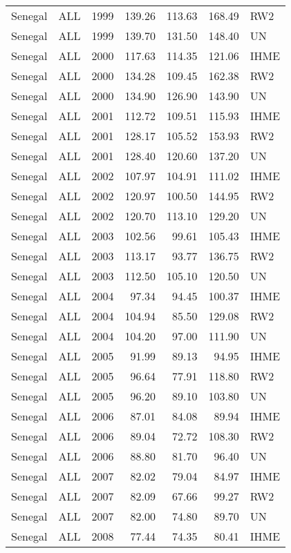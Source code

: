 \begin{longtable}{lllrrrl}
  Senegal & ALL & 1999 & 139.26 & 113.63 & 168.49 & RW2 \\ 
  Senegal & ALL & 1999 & 139.70 & 131.50 & 148.40 & UN \\ 
  Senegal & ALL & 2000 & 117.63 & 114.35 & 121.06 & IHME \\ 
  Senegal & ALL & 2000 & 134.28 & 109.45 & 162.38 & RW2 \\ 
  Senegal & ALL & 2000 & 134.90 & 126.90 & 143.90 & UN \\ 
  Senegal & ALL & 2001 & 112.72 & 109.51 & 115.93 & IHME \\ 
  Senegal & ALL & 2001 & 128.17 & 105.52 & 153.93 & RW2 \\ 
  Senegal & ALL & 2001 & 128.40 & 120.60 & 137.20 & UN \\ 
  Senegal & ALL & 2002 & 107.97 & 104.91 & 111.02 & IHME \\ 
  Senegal & ALL & 2002 & 120.97 & 100.50 & 144.95 & RW2 \\ 
  Senegal & ALL & 2002 & 120.70 & 113.10 & 129.20 & UN \\ 
  Senegal & ALL & 2003 & 102.56 & 99.61 & 105.43 & IHME \\ 
  Senegal & ALL & 2003 & 113.17 & 93.77 & 136.75 & RW2 \\ 
  Senegal & ALL & 2003 & 112.50 & 105.10 & 120.50 & UN \\ 
  Senegal & ALL & 2004 & 97.34 & 94.45 & 100.37 & IHME \\ 
  Senegal & ALL & 2004 & 104.94 & 85.50 & 129.08 & RW2 \\ 
  Senegal & ALL & 2004 & 104.20 & 97.00 & 111.90 & UN \\ 
  Senegal & ALL & 2005 & 91.99 & 89.13 & 94.95 & IHME \\ 
  Senegal & ALL & 2005 & 96.64 & 77.91 & 118.80 & RW2 \\ 
  Senegal & ALL & 2005 & 96.20 & 89.10 & 103.80 & UN \\ 
  Senegal & ALL & 2006 & 87.01 & 84.08 & 89.94 & IHME \\ 
  Senegal & ALL & 2006 & 89.04 & 72.72 & 108.30 & RW2 \\ 
  Senegal & ALL & 2006 & 88.80 & 81.70 & 96.40 & UN \\ 
  Senegal & ALL & 2007 & 82.02 & 79.04 & 84.97 & IHME \\ 
  Senegal & ALL & 2007 & 82.09 & 67.66 & 99.27 & RW2 \\ 
  Senegal & ALL & 2007 & 82.00 & 74.80 & 89.70 & UN \\ 
  Senegal & ALL & 2008 & 77.44 & 74.35 & 80.41 & IHME \\ 

\end{longtable}
